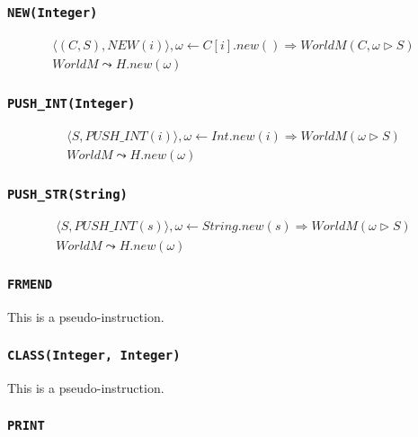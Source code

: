 \documentclass[]{article}
\numberwithin{equation}{section}
\numberwithin{figure}{section}
\numberwithin{table}{section}
\begin{document}
\subsubsection{\texttt{NEW(Integer)}}\label{newinteger}

\begin{gather*}
  \langle (C, S), NEW(i)\rangle, \omega \leftarrow C[i].new() \Rightarrow WorldM (C, \omega \rhd S)\\
  WorldM \leadsto H.new(\omega)
\end{gather*}

\subsubsection{\texttt{PUSH\_INT(Integer)}}\label{pushux5fintinteger}

\begin{gather*}
  \langle S, PUSH\_INT(i)\rangle, \omega \leftarrow Int.new(i) \Rightarrow WorldM (\omega \rhd S)\\
  WorldM \leadsto H.new(\omega)
\end{gather*}

\subsubsection{\texttt{PUSH\_STR(String)}}\label{pushux5fstrstring}

\begin{gather*}
  \langle S, PUSH\_INT(s)\rangle, \omega \leftarrow String.new(s) \Rightarrow WorldM (\omega \rhd S)\\
  WorldM \leadsto H.new(\omega)
\end{gather*}

\subsubsection{\texttt{FRMEND}}\label{frmend}

This is a pseudo-instruction.

\subsubsection{\texttt{CLASS(Integer, Integer)}}\label{classinteger-integer}

This is a pseudo-instruction.

\subsubsection{\texttt{PRINT}}\label{print}
\end{document}
